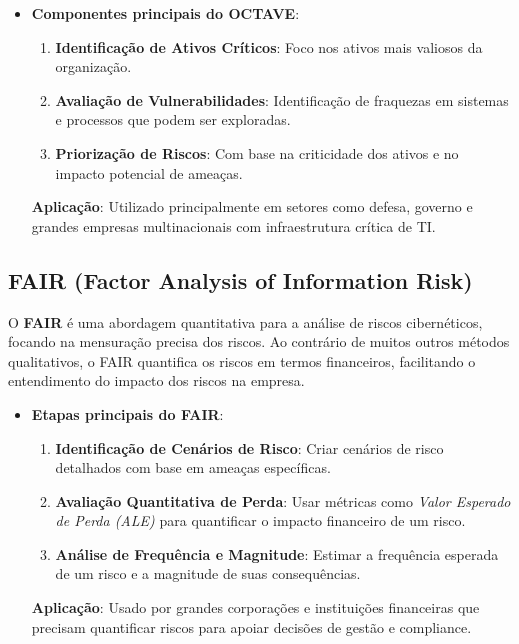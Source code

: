\documentclass[12pt,oneside,a4paper,article]{abntex2}
\begin{document}
\begin{itemize}
    \item \textbf{Componentes principais do OCTAVE}:
    \begin{enumerate}
        \item \textbf{Identificação de Ativos Críticos}: Foco nos ativos mais valiosos da organização.
        \item \textbf{Avaliação de Vulnerabilidades}: Identificação de fraquezas em sistemas e processos que podem ser exploradas.
        \item \textbf{Priorização de Riscos}: Com base na criticidade dos ativos e no impacto potencial de ameaças.
    \end{enumerate}
    \textbf{Aplicação}: Utilizado principalmente em setores como defesa, governo e grandes empresas multinacionais com infraestrutura crítica de TI.
\end{itemize}

\subsection{FAIR (Factor Analysis of Information Risk)}

O \textbf{FAIR} é uma abordagem quantitativa para a análise de riscos cibernéticos, focando na mensuração precisa dos riscos. Ao contrário de muitos outros métodos qualitativos, o FAIR quantifica os riscos em termos financeiros, facilitando o entendimento do impacto dos riscos na empresa.

\begin{itemize}
    \item \textbf{Etapas principais do FAIR}:
    \begin{enumerate}
        \item \textbf{Identificação de Cenários de Risco}: Criar cenários de risco detalhados com base em ameaças específicas.
        \item \textbf{Avaliação Quantitativa de Perda}: Usar métricas como \textit{Valor Esperado de Perda (ALE)} para quantificar o impacto financeiro de um risco.
        \item \textbf{Análise de Frequência e Magnitude}: Estimar a frequência esperada de um risco e a magnitude de suas consequências.
    \end{enumerate}
    \textbf{Aplicação}: Usado por grandes corporações e instituições financeiras que precisam quantificar riscos para apoiar decisões de gestão e compliance.
\end{itemize}
\end{document}
